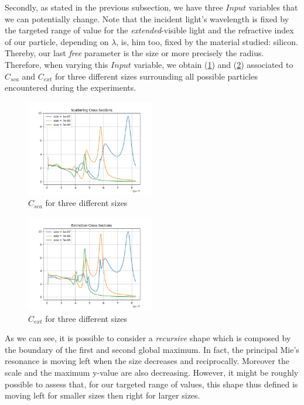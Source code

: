 \documentclass{article}
\numberwithin{equation}{section}
\begin{document}
Secondly, as stated in the previous subsection, we have three $Input$ variables that we can potentially change. Note that the incident light's wavelength is fixed by the targeted range of value for the \textit{extended}-visible light and the refractive index of our particle, depending on $\lambda$, is, him too, fixed by the material studied: silicon. Thereby, our last \textit{free} parameter is the size or more precisely the radius. Therefore, when varying this $Input$ variable, we obtain (\ref{fig:sca_var}) and (\ref{fig:ext_var}) associated to $C_{sca}$ and $C_{ext}$ for three different sizes surrounding all possible particles encountered during the experiments.
\begin{figure}[h]
    \centering
    \includegraphics[width=0.5\textwidth, height=0.4\textwidth]{sca_var.png}
    \caption{$C_{sca}$ for three different sizes}
    \label{fig:sca_var}
\end{figure}
\begin{figure}[h]
    \centering
    \includegraphics[width=0.5\textwidth, height=0.4\textwidth]{ext_var.png}
    \caption{$C_{ext}$ for three different sizes}
    \label{fig:ext_var}
\end{figure}
As we can see, it is possible to consider a \textit{recursive} shape which is composed by the boundary of the first and second global maximum. In fact, the principal Mie's resonance is moving left when the size decreases and reciprocally. Moreover the scale and the maximum y-value are also decreasing. However, it might be roughly possible to assess that, for our targeted range of values, this shape thus defined is moving left for smaller sizes then right for larger sizes.
\end{document}
